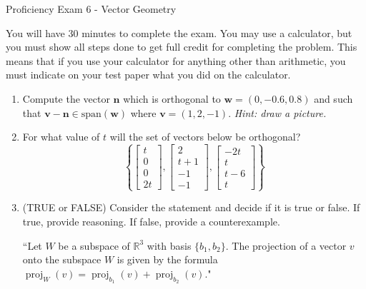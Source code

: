 \documentclass[14pt]{article}
\DeclareMathOperator{\proj}{proj}
\begin{document}
\begin{center}
Proficiency Exam 6 - Vector Geometry
\end{center}

You will have 30 minutes to complete the exam.  You may use a calculator, but you must show all steps done to get full credit for completing the problem.  This means that if you use your calculator for anything other than arithmetic, you must indicate on your test paper what you did on the calculator.

\begin{enumerate}

\item Compute the vector $ \mathbf{n} $ which is orthogonal to $ \mathbf{w} = (0,-0.6,0.8) $ and such that $ \mathbf{v} - \mathbf{n} \in \text{span}(\mathbf{w}) $ where $ \mathbf{v} = (1,2,-1) $. {\it Hint: draw a picture.}

\item For what value of $ t $ will the set of vectors below be orthogonal?
\[
\left\lbrace\left[\begin{array}{c} t \\ 0 \\ 0 \\ 2t \end{array}\right],
\left[\begin{array}{c} 2 \\ t+1 \\ -1 \\ -1  \end{array}\right],
\left[\begin{array}{c} -2t \\ t \\ t-6 \\ t \end{array}\right]\right\rbrace
\]

\item (TRUE or FALSE) Consider the statement and decide if it is true or false.  If true, provide reasoning.  If false, provide a counterexample.
\begin{center}
``Let $ W $ be a subspace of $ \mathbb{R}^3 $ with basis $ \{b_1,b_2\} $.  The projection of a vector $ v $ onto the subspace $ W $ is given by the formula $ \proj_W(v) = \proj_{b_1}(v) + \proj_{b_2}(v) $."
\end{center}


\end{enumerate}
\end{document}
